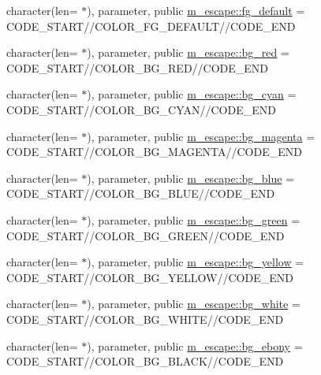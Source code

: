 \begin{DoxyCompactItemize}
\item 
character(len= $\ast$), parameter, public \mbox{\hyperlink{namespacem__escape_a518f003512a7505cb8bf9585c103900e}{m\+\_\+escape\+::fg\+\_\+default}} = C\+O\+D\+E\+\_\+\+S\+T\+A\+RT//C\+O\+L\+O\+R\+\_\+\+F\+G\+\_\+\+D\+E\+F\+A\+U\+LT//C\+O\+D\+E\+\_\+\+E\+ND
\item 
character(len= $\ast$), parameter, public \mbox{\hyperlink{namespacem__escape_a3cd9ef6cdd5ab3dda36cc9402dff0806}{m\+\_\+escape\+::bg\+\_\+red}} = C\+O\+D\+E\+\_\+\+S\+T\+A\+RT//C\+O\+L\+O\+R\+\_\+\+B\+G\+\_\+\+R\+ED//C\+O\+D\+E\+\_\+\+E\+ND
\item 
character(len= $\ast$), parameter, public \mbox{\hyperlink{namespacem__escape_a7b7a979cd6dc44533f962d323c65a7b6}{m\+\_\+escape\+::bg\+\_\+cyan}} = C\+O\+D\+E\+\_\+\+S\+T\+A\+RT//C\+O\+L\+O\+R\+\_\+\+B\+G\+\_\+\+C\+Y\+AN//C\+O\+D\+E\+\_\+\+E\+ND
\item 
character(len= $\ast$), parameter, public \mbox{\hyperlink{namespacem__escape_aaf244507d267d0ae99ea933a8744c7e4}{m\+\_\+escape\+::bg\+\_\+magenta}} = C\+O\+D\+E\+\_\+\+S\+T\+A\+RT//C\+O\+L\+O\+R\+\_\+\+B\+G\+\_\+\+M\+A\+G\+E\+N\+TA//C\+O\+D\+E\+\_\+\+E\+ND
\item 
character(len= $\ast$), parameter, public \mbox{\hyperlink{namespacem__escape_afab2229302287eaa0eb05add07bb6621}{m\+\_\+escape\+::bg\+\_\+blue}} = C\+O\+D\+E\+\_\+\+S\+T\+A\+RT//C\+O\+L\+O\+R\+\_\+\+B\+G\+\_\+\+B\+L\+UE//C\+O\+D\+E\+\_\+\+E\+ND
\item 
character(len= $\ast$), parameter, public \mbox{\hyperlink{namespacem__escape_a5754e4af92f738d3fd7c95daeaa7f2e1}{m\+\_\+escape\+::bg\+\_\+green}} = C\+O\+D\+E\+\_\+\+S\+T\+A\+RT//C\+O\+L\+O\+R\+\_\+\+B\+G\+\_\+\+G\+R\+E\+EN//C\+O\+D\+E\+\_\+\+E\+ND
\item 
character(len= $\ast$), parameter, public \mbox{\hyperlink{namespacem__escape_afe23b71a7646ac88c8c74358994f92d0}{m\+\_\+escape\+::bg\+\_\+yellow}} = C\+O\+D\+E\+\_\+\+S\+T\+A\+RT//C\+O\+L\+O\+R\+\_\+\+B\+G\+\_\+\+Y\+E\+L\+L\+OW//C\+O\+D\+E\+\_\+\+E\+ND
\item 
character(len= $\ast$), parameter, public \mbox{\hyperlink{namespacem__escape_a87dfd88e3190a8717cc574d4f2a4445c}{m\+\_\+escape\+::bg\+\_\+white}} = C\+O\+D\+E\+\_\+\+S\+T\+A\+RT//C\+O\+L\+O\+R\+\_\+\+B\+G\+\_\+\+W\+H\+I\+TE//C\+O\+D\+E\+\_\+\+E\+ND
\item 
character(len= $\ast$), parameter, public \mbox{\hyperlink{namespacem__escape_ab3691cc02cfaf12d6f7e18fac8a70b0b}{m\+\_\+escape\+::bg\+\_\+ebony}} = C\+O\+D\+E\+\_\+\+S\+T\+A\+RT//C\+O\+L\+O\+R\+\_\+\+B\+G\+\_\+\+B\+L\+A\+CK//C\+O\+D\+E\+\_\+\+E\+ND

\end{DoxyCompactItemize}
